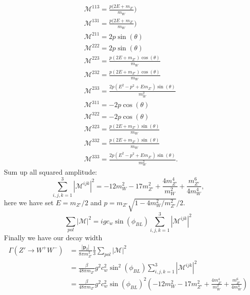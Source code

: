 \documentclass{report}
\newcommand{\nn}{\nonumber}
\numberwithin{equation}{section}
\begin{document}
\begin{align}
&\mathcal{M}^{113}=\frac{p(2E+m_{Z'}}{m_W})\nn\\
&\mathcal{M}^{131}=\frac{p(2E+m_{Z'}}{m_W})\nn\\
&\mathcal{M}^{211}=2 p \sin(\theta)\nn\\
&\mathcal{M}^{222}=2 p \sin(\theta)\nn\\
&\mathcal{M}^{223}=\frac{p (2E+m_{Z'})\cos(\theta)}{m_W}\nn\\
&\mathcal{M}^{232}=\frac{p (2E+m_{Z'})\cos(\theta)}{m_W}\nn\\
&\mathcal{M}^{233}=\frac{2 p (E^2-p^2+E m_{Z'})\sin(\theta)}{m^2_W}\nn\\
&\mathcal{M}^{311}=-2 p \cos(\theta)\nn\\
&\mathcal{M}^{322}=-2 p \cos(\theta)\nn\\
&\mathcal{M}^{323}=\frac{p (2E+m_{Z'})\sin(\theta)}{m_W}\nn\\
&\mathcal{M}^{332}=\frac{p (2E+m_{Z'})\sin(\theta)}{m_W}\nn\\
&\mathcal{M}^{333}=\frac{2 p (E^2-p^2+E m_{Z'})\sin(\theta)}{m^2_W}.
\end{align}
Sum up all squared amplitude:
\begin{equation}
\sum_{i,j,k=1}^3 |\mathcal{M}^{ijk}|^2=-12m_W^2-17m_{Z'}^2+\frac{4m_{Z'}^4}{m_W^2}+ \frac{m_{Z'}^6}{4m_W^4},
\end{equation}
here we have set $E=m_{Z'}/2$ and $p=m_{Z'}\sqrt{1-4 m_W^2/m_{Z'}^2}/2$. 
\begin{equation}
\sum_{pol}|\mathcal{M}|^2=igc_w\sin(\phi_{BL}) \sum_{i,j,k=1}^3 |\mathcal{M}^{ijk}|^2
\end{equation}
Finally we have our decay width
\begin{align}
\Gamma(Z'\rightarrow W^+W^-)&=\frac{|\textbf{p}_2|}{8 \pi m_{Z'}^2}\frac{1}{3}\sum_{pol}|\mathcal{M}|^2\nn\\
&=\frac{\beta}{48 \pi m_{Z'}}g^2c^2_w\sin^2(\phi_{BL}) \sum_{i,j,k=1}^3 |\mathcal{M}^{ijk}|^2\nn\\
&=\frac{\beta}{48 \pi m_{Z'}}g^2 c_w^2 \sin(\phi_{BL})^2(-12m_W^2-17m_{Z'}^2+\frac{4m_{Z'}^4}{m_W^2}+ \frac{m_{Z'}^6}{4m_W^4})
\end{align}
\end{document}
